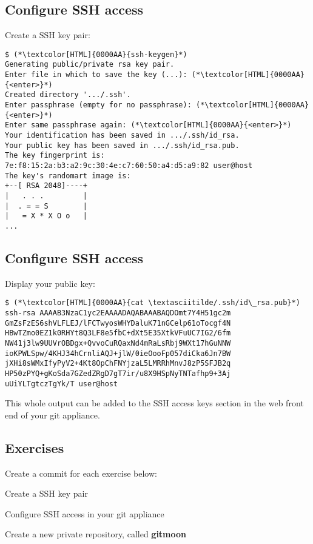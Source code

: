 \subsection{Configure SSH access}
\begin{frame}[fragile]
  \subslidetitle
  Create a SSH key pair:
  \begin{lstlisting}
$ (*\textcolor[HTML]{0000AA}{ssh-keygen}*)
Generating public/private rsa key pair.
Enter file in which to save the key (...): (*\textcolor[HTML]{0000AA}{<enter>}*)
Created directory '.../.ssh'.
Enter passphrase (empty for no passphrase): (*\textcolor[HTML]{0000AA}{<enter>}*)
Enter same passphrase again: (*\textcolor[HTML]{0000AA}{<enter>}*)
Your identification has been saved in .../.ssh/id_rsa.
Your public key has been saved in .../.ssh/id_rsa.pub.
The key fingerprint is:
7e:f8:15:2a:b3:a2:9c:30:4e:c7:60:50:a4:d5:a9:82 user@host
The key's randomart image is:
+--[ RSA 2048]----+
|   . . .         |
|  . = = S        |
|   = X * X O o   |
...
\end{lstlisting}
\end{frame}

\subsection{Configure SSH access}
\begin{frame}[fragile]
  \subslidetitle
  Display your public key:
  \begin{lstlisting}
$ (*\textcolor[HTML]{0000AA}{cat \textasciitilde/.ssh/id\_rsa.pub}*)
ssh-rsa AAAAB3NzaC1yc2EAAAADAQABAAABAQDOmt7Y4H51gc2m
GmZsFzES6shVLFLEJ/lFCTwyosWHYDaluK71nGCelp61oTocgf4N
HBwTZmo0EZ1k0RHYt8Q3LF8e5fbC+dXt5E35XtkVFuUC7IG2/6fm
NW41j3lw9UUVrOBDgx+QvvoCuRQaxNd4mRaLsRbj9WXt17hGuNNW
ioKPWLSpw/4KHJ34hCrnliAQJ+jlW/0ieOooFp057diCka6Jn7BW
jXHi8sWMxIfyPyV2+4Kt8OpChFNYjzaL5LMRRhMnvJ8zP5SFJB2q
HP50zPYQ+gKoSda7GZedZRgD7gT7ir/u8X9HSpNyTNTafhp9+3Aj
uUiYLTgtczTgYk/T user@host
\end{lstlisting}

  This whole output can be added to the SSH access keys
  section in the web front end of your git appliance.
\end{frame}

\subsection{Exercises}
\begin{frame}[fragile]
  \subslidetitle
  Create a commit for each exercise below:
  \begin{exercise}
    \item Create a SSH key pair
    \item Configure SSH access in your git appliance
    \item Create a new private repository, called \textbf{gitmoon}
  \end{exercise}
\end{frame}

